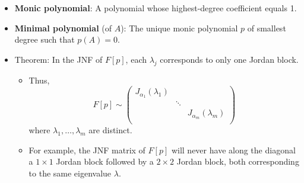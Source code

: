 \documentclass[../notes.tex]{subfiles}
\begin{document}
\begin{itemize}
\begin{itemize}
\begin{proof}
            Do the Laplace expansion with respect to the last column of $A-zI$ (companion) or last row (Frobenius).
        \end{proof}
        \item Roots of $p(z)$ are the eigenvalues of $F[p]$ and $C[p]$.
        \item Claim: $C[p]$ has \textbf{minimal polynomial} $p(z)$.
        \begin{proof}
            We have that $C[p]e_i=e_{i+1}$ for $i=1,\dots,n-1$ and
            \begin{equation*}
                C[p]e_n = -a_0e_1-\cdots-a_{n-1}e_n
            \end{equation*}
            which implies that if $r(z)/\deg r<n$ nullifies $C[p]$, then necessarily $r(z)=p(z)$ since $(z-\lambda_j)^{<\alpha_j}$??
        \end{proof}
        \item Claim: $C[p],F[p]$ have the same Jordan normal form.
        \begin{itemize}
            \item More generally, transpose matrices are similar so they have the same JNF.
        \end{itemize}
    \end{itemize}
    \item \textbf{Monic polynomial}: A polynomial whose highest-degree coefficient equals 1.
    \item \textbf{Minimal polynomial} (of $A$): The unique monic polynomial $p$ of smallest degree such that $p(A)=0$.
    \item Theorem: In the JNF of $F[p]$, each $\lambda_j$ corresponds to only one Jordan block.
    \begin{itemize}
        \item Thus,
        \begin{equation*}
            F[p] \sim
            \begin{pmatrix}
                J_{\alpha_1}(\lambda_1) &  & \\
                 & \ddots & \\
                 &  & J_{\alpha_m}(\lambda_m)\\
            \end{pmatrix}
        \end{equation*}
        where $\lambda_1,\dots,\lambda_m$ are distinct.
        \item For example, the JNF matrix of $F[p]$ will never have along the diagonal a $1\times 1$ Jordan block followed by a $2\times 2$ Jordan block, both corresponding to the same eigenvalue $\lambda$.

\end{itemize}
\end{itemize}
\end{document}
